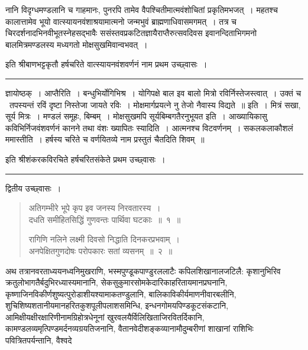 \documentclass[11pt, openany]{book}
\begin{document}
\newpage

\noindent
नानि विदृग्धमण्डलानि च गाहमानः, पुनरपि तामेव वैपश्चितीमात्मवंशोचितां प्रकृतिमभजत्~। महतश्च कालात्तामेव भूयो वात्स्यायनवंशाश्रयामात्मनो जन्मभुवं ब्राह्मणाधिवासमगमत्~। तत्र च चिरदर्शनादभिनवीभूतस्नेहसद्भावैः ससंस्तवप्रकटितज्ञायैराप्तैरुत्सवदिवस इवानन्दिताभिगमनो बालमित्रमण्डलस्य मध्यगतो मोक्षसुखमिवान्वभवत्~।

\begin{center}
{\s इति श्रीबाणभट्टकृतौ हर्षचरिते वात्स्यायनवंशवर्णनं नाम प्रथम उच्छ्वासः~।}
\end{center}

\hrule

\noindent
{\s ज्ञायोष्ठक्~। {\qtt आप्तैरिति}~। बन्धुभिर्योगिभिश्र~। योगिपक्षे बाल इव बालो मित्रो रविर्निस्तेजस्त्वात्~। उक्तं च \textendash\ {\qt तपस्यन्तं रविं दृष्टा निस्तेजा जायते रविः~। मोक्षमार्गप्रयत्ने नु तेजो नैवास्य विद्यते~॥} इति~। मित्रं सखा, सूर्य मित्रः~। मण्डलं समूहः, बिम्बम्~। मोक्षसुखमपि सूर्यबिम्बगतैरनुभूयत इति~। आख्यायिकासु कविभिर्निजवंशवर्णनं कानने तथा वंशः ख्यापितः स्यादिति~। आत्मनश्च विटवर्णनम्~। सकलकलाकौशलं ममास्तीति~। हर्षस्य चरिते च वर्णयितव्ये नाम प्रस्तुतं चैतदिति शिवम्~॥}

\begin{center}
{\s इति श्रीशंकरकविरचिते हर्षचरितसंकेते प्रथम उच्छ्वासः~।}
\end{center}

\vspace*{\fill}

\begin{center}
\rule{0.2\linewidth}{0.5pt}
\end{center}

\vspace*{\fill}

\newpage

\begin{center}
{\s द्वितीय उच्छ्वासः~।}
\end{center}

\vspace{-5mm}
\begin{quote}
{\ha अतिगम्भीरे भूपे कृप इव जनस्य निरवतारस्य~।\\
दधति समीहितसिद्धिं गुणवन्तः पार्थिवा घटकाः~॥~१~॥

रागिणि नलिने लक्ष्मी दिवसो निद्धाति दिनकरप्रभवाम्~।\\
अनपेक्षितगुणदोषः परोपकारः सतां व्यसनम्~॥~२~॥}
\end{quote}

\vspace{-5mm}
अथ तत्रानवरताध्ययनध्वनिमुखराणि, भस्मपुण्डूकपाण्डुरललाटैः कपिलशिखानालजटिलै: कृशानुभिरिव क्रतुलोभागतैर्बदुभिरध्यास्यमानानि, सेकसुकुमारसोमकेदारिकाहरितायमानप्रघनानि, कृष्णाजिनविकीर्णशुष्यत्पुरोडाशीयश्यामाकतण्डुलानि, बालिकाविकीर्यमाणनीवारबलीनि, शुचिशिष्यशतानीयमानहरितकुशपूलीपलाशसमिन्धि, इन्धनगोमयपिण्डकूटसंकटानि, आमिक्षीयक्षीरक्षारिणीनामग्रिहोत्रधेनूनां खुरवलयैर्विलिखिताजिरवितर्दिकानि, कामण्डलव्यमृत्पिण्डमर्दनव्यग्रयतिजनानि, वैतानवेदीशङ्कव्यानामौदुम्बरीणां शाखानां राशिभिः पवित्रितपर्यन्तानि, वैश्वदे\textendash
\end{document}
